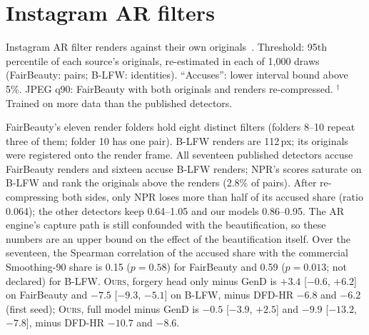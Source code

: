 \documentclass[10pt]{article}
\newcommand{\oursB}{\textsc{Ours}, forgery head only}
\newcommand{\oursF}{\textsc{Ours}, full model}
\begin{document}
\section{Instagram AR filters}
\label{sec:ar}
\begin{table}[H]
\centering
\caption{Instagram AR filter renders against their own originals~\cite{openfilter2022}. Threshold: 95th percentile of each source's
originals, re-estimated in each of 1,000 draws (FairBeauty: pairs; B-LFW: identities). ``Accuses'': lower interval bound above
5\%. JPEG q90: FairBeauty with both originals and renders re-compressed. $^\dagger$Trained on more data than the published
detectors.}
\label{tab:ar}
\scriptsize
\begin{adjustbox}{max width=\linewidth}\end{adjustbox}
\end{table}
FairBeauty's eleven render folders hold eight distinct filters (folders 8--10 repeat three of them; folder 10 has one pair). B-LFW
renders are 112\,px; its originals were registered onto the render frame. All seventeen published detectors accuse FairBeauty
renders and sixteen accuse B-LFW renders; NPR's scores saturate on B-LFW and rank the originals above the renders (2.8\% of pairs).
After re-compressing both sides, only NPR loses more than half of its accused share (ratio 0.064); the other detectors keep
0.64--1.05 and our models 0.86--0.95. The AR engine's capture path is still confounded with the beautification, so these numbers
are an upper bound on the effect of the beautification itself. Over the seventeen, the Spearman correlation of the accused share
with the commercial Smoothing-90 share is 0.15 ($p=0.58$) for FairBeauty and 0.59 ($p=0.013$; not declared) for B-LFW. \oursB{}
minus GenD is $+3.4$ [$-0.6$, $+6.2$] on FairBeauty and $-7.5$ [$-9.3$, $-5.1$] on B-LFW, minus DFD-HR $-6.8$ and $-6.2$ (first
seed); \oursF{} minus GenD is $-0.5$ [$-3.9$, $+2.5$] and $-9.9$ [$-13.2$, $-7.8$], minus DFD-HR $-10.7$ and $-8.6$.
\end{document}
